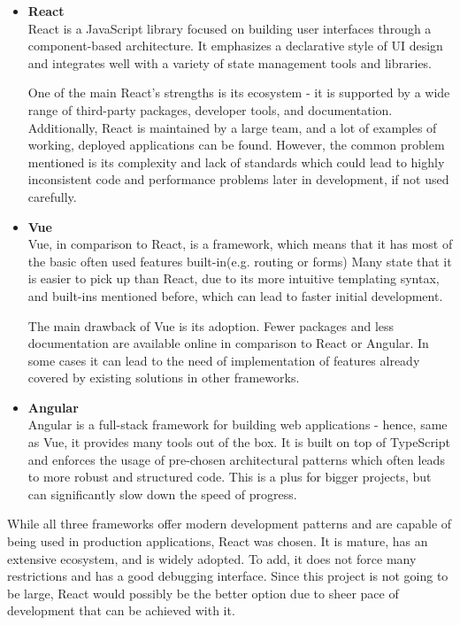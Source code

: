 \begin{itemize}
    \item \textbf{React} \\
    React is a JavaScript library focused on building user interfaces through a component-based architecture.\cite{react}
    It emphasizes a declarative style of UI design and integrates well with a variety of state management tools and libraries.

    One of the main React’s strengths is its ecosystem - it is supported by a wide range of third-party packages,
    developer tools, and documentation.
    Additionally, React is maintained by a large team, and a lot of examples of working, deployed applications can be found.
    However, the common problem mentioned is its complexity and lack of standards which could lead to highly inconsistent
    code and performance problems later in development, if not used carefully.

    \item \textbf{Vue} \\
    Vue, in comparison to React, is a framework, which means that it has most of the basic often used features built-in(e.g. routing or forms)\cite{vue}
    Many state that it is easier to pick up than React, due to its more intuitive templating syntax, and built-ins mentioned before,
    which can lead to faster initial development.

    The main drawback of Vue is its adoption.\cite{frameworkdata}
    Fewer packages and less documentation are available online in comparison to React or Angular.
    In some cases it can lead to the need of implementation of features already covered by existing solutions in other frameworks.

    \item \textbf{Angular} \\
    Angular is a full-stack framework for building web applications - hence, same as Vue, it provides many tools out of the box.
    It is built on top of TypeScript and enforces the usage of pre-chosen architectural patterns which often leads to
    more robust and structured code. This is a plus for bigger projects, but can significantly slow down the speed of
    progress.

\end{itemize}

While all three frameworks offer modern development patterns and are capable of being used in production applications,
React was chosen. It is mature, has an extensive ecosystem, and is widely adopted. To add, it does not force many
restrictions and has a good debugging interface. Since this project is not going to be large, React would possibly be the
better option due to sheer pace of development that can be achieved with it.

